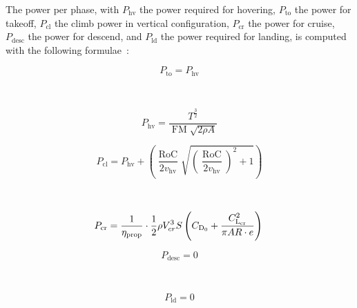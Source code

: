 The power per phase, with $P_{\text{hv}}$ the power required for hovering, $P_{\text{to}}$ the power for takeoff, $P_{\text{cl}}$ the climb power in vertical configuration, $P_{\text{cr}}$ the power for cruise, $P_{\text{desc}}$ the power for descend, and $P_{\text{ld}}$ the power required for landing, is computed with the following formulae~\cite{Ugwueze_Sizing_Method}:


\begin{minipage}{.45\linewidth}
\begin{equation}
\label{eq:ClassII_power_takeoff}
    P_{\text{to}} = P_{\text{hv}} 
\end{equation}
\end{minipage}
~
\begin{minipage}{.45\linewidth}
\begin{equation}
\label{eq:ClassII_power_hovering}
    P_{\text{hv}} = \frac{T^\frac32}{\operatorname{FM}\sqrt{2\rho A}} 
\end{equation}
\end{minipage}

\begin{minipage}{.45\linewidth}
\begin{equation}
\label{eq:ClassII_power_climb}
    P_{\text{cl}} = P_{\text{hv}} + \left( \frac{\operatorname{RoC}}{2v_{\text{hv}}} \sqrt{\left( \frac{\operatorname{RoC}}{2v_{\text{hv}}} \right)^2 + 1} \right) 
\end{equation}
\end{minipage}
~
\begin{minipage}{.45\linewidth}
\begin{equation}
\label{eq:ClassII_power_cruise}
    P_{\text{cr}} = \frac{1}{\eta_{\text{prop}}} \cdot \frac12 \rho V_{cr}^3 S \left( C_{\text{D}_0} + \frac{C_{\text{L}_{\text{cr}}}^2}{\pi AR\cdot e} \right) \\
\end{equation}
\end{minipage}

\begin{minipage}{.45\linewidth}
\begin{equation}
\label{eq:ClassII_power_descend}
    P_{\text{desc}} = 0
\end{equation}
\end{minipage}
~
\begin{minipage}{.45\linewidth}
\begin{equation}
\label{eq:ClassII_power_landing}
    P_{\text{ld}} = 0
\end{equation}
\end{minipage}   




